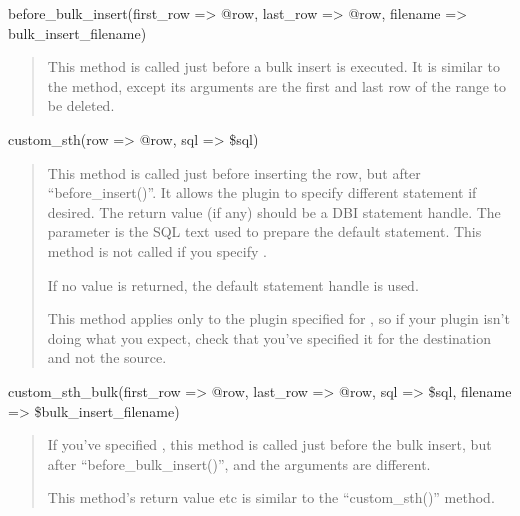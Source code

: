 \documentclass[letterpaper,10pt,english]{sphinxmanual}
\begin{document}
\sphinxAtStartPar
before\_bulk\_insert(first\_row =\textgreater{} @row, last\_row =\textgreater{} @row, filename =\textgreater{} bulk\_insert\_filename)
\begin{quote}

\sphinxAtStartPar
This method is called just before a bulk insert is executed.  It is similar to
the  method, except its arguments are the first and last row of
the range to be deleted.
\end{quote}

\sphinxAtStartPar
custom\_sth(row =\textgreater{} @row, sql =\textgreater{} \$sql)
\begin{quote}

\sphinxAtStartPar
This method is called just before inserting the row, but after
“before\_insert()”.  It allows the plugin to specify different 
statement if desired.  The return value (if any) should be a DBI statement
handle.  The  parameter is the SQL text used to prepare the default
 statement.  This method is not called if you specify
{\hyperref[\detokenize{mariadb-archiver:cmdoption-mariadb-archiver-bulk-insert}]{}}.

\sphinxAtStartPar
If no value is returned, the default  statement handle is used.

\sphinxAtStartPar
This method applies only to the plugin specified for {\hyperref[\detokenize{mariadb-archiver:cmdoption-mariadb-archiver-dest}]{}}, so if your
plugin isn’t doing what you expect, check that you’ve specified it for the
destination and not the source.
\end{quote}

\sphinxAtStartPar
custom\_sth\_bulk(first\_row =\textgreater{} @row, last\_row =\textgreater{} @row, sql =\textgreater{} \$sql, filename =\textgreater{} \$bulk\_insert\_filename)
\begin{quote}

\sphinxAtStartPar
If you’ve specified {\hyperref[\detokenize{mariadb-archiver:cmdoption-mariadb-archiver-bulk-insert}]{}}, this method is called just before the
bulk insert, but after “before\_bulk\_insert()”, and the arguments are
different.

\sphinxAtStartPar
This method’s return value etc is similar to the “custom\_sth()” method.
\end{quote}
\end{document}
